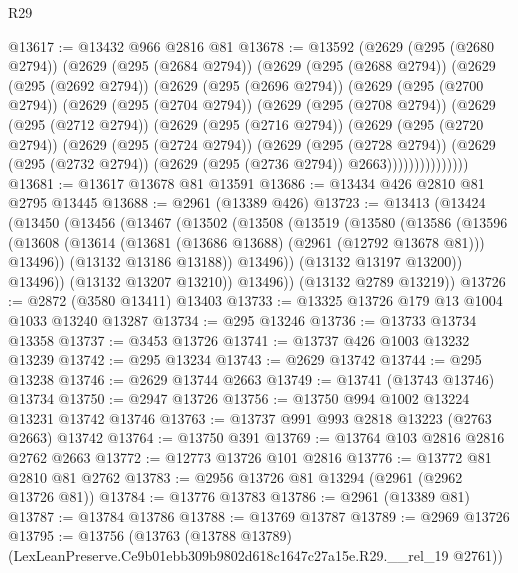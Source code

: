 \begin{lexlean}{R29}
\begin{coremodule}
@13617 := @13432 @966 @2816 @81
@13678 := @13592
    (@2629
      (@295 (@2680 @2794))
      (@2629
        (@295 (@2684 @2794))
        (@2629
          (@295 (@2688 @2794))
          (@2629
            (@295 (@2692 @2794))
            (@2629
              (@295 (@2696 @2794))
              (@2629
                (@295 (@2700 @2794))
                (@2629
                  (@295 (@2704 @2794))
                  (@2629
                    (@295 (@2708 @2794))
                    (@2629
                      (@295 (@2712 @2794))
                      (@2629
                        (@295 (@2716 @2794))
                        (@2629
                          (@295 (@2720 @2794))
                          (@2629
                            (@295 (@2724 @2794))
                            (@2629
                              (@295 (@2728 @2794))
                              (@2629
                                (@295 (@2732 @2794))
                                (@2629 (@295 (@2736 @2794)) @2663)))))))))))))))
@13681 := @13617 @13678 @81 @13591
@13686 := @13434 @426 @2810 @81 @2795 @13445
@13688 := @2961 (@13389 @426)
@13723 := @13413
    (@13424
      (@13450
        (@13456
          (@13467
            (@13502
              (@13508
                (@13519
                  (@13580
                    (@13586
                      (@13596
                        (@13608
                          (@13614 (@13681 (@13686 @13688) (@2961 (@12792 @13678 @81))) @13496))
                        (@13132 @13186 @13188))
                      @13496))
                  (@13132 @13197 @13200))
                @13496))
            (@13132 @13207 @13210))
          @13496))
      (@13132 @2789 @13219))
@13726 := @2872 (@3580 @13411) @13403
@13733 := @13325 @13726 @179 @13 @1004 @1033 @13240 @13287
@13734 := @295 @13246
@13736 := @13733 @13734 @13358
@13737 := @3453 @13726
@13741 := @13737 @426 @1003 @13232 @13239
@13742 := @295 @13234
@13743 := @2629 @13742
@13744 := @295 @13238
@13746 := @2629 @13744 @2663
@13749 := @13741 (@13743 @13746) @13734
@13750 := @2947 @13726
@13756 := @13750 @994 @1002 @13224 @13231 @13742 @13746
@13763 := @13737 @991 @993 @2818 @13223 (@2763 @2663) @13742
@13764 := @13750 @391
@13769 := @13764 @103 @2816 @2816 @2762 @2663
@13772 := @12773 @13726 @101 @2816
@13776 := @13772 @81 @2810 @81 @2762
@13783 := @2956 @13726 @81 @13294 (@2961 (@2962 @13726 @81))
@13784 := @13776 @13783
@13786 := @2961 (@13389 @81)
@13787 := @13784 @13786
@13788 := @13769 @13787
@13789 := @2969 @13726
@13795 := @13756
    (@13763 (@13788 @13789) (LexLeanPreserve.Ce9b01ebb309b9802d618c1647c27a15e.R29.__rel_19 @2761))

\end{coremodule}
\end{lexlean}
